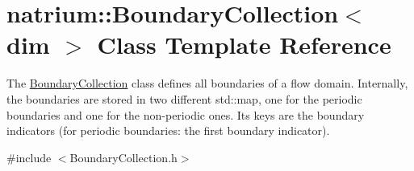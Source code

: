 \hypertarget{classnatrium_1_1BoundaryCollection}{\section{natrium\-:\-:Boundary\-Collection$<$ dim $>$ Class Template Reference}
\label{classnatrium_1_1BoundaryCollection}
}


The \hyperlink{classnatrium_1_1BoundaryCollection}{Boundary\-Collection} class defines all boundaries of a flow domain. Internally, the boundaries are stored in two different std\-::map, one for the periodic boundaries and one for the non-\/periodic ones. Its keys are the boundary indicators (for periodic boundaries\-: the first boundary indicator).  




{\ttfamily \#include $<$Boundary\-Collection.\-h$>$}

